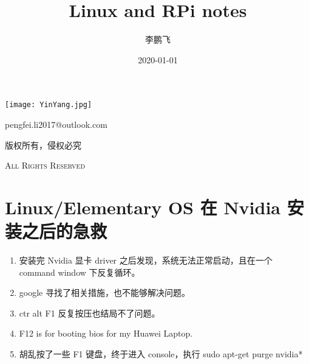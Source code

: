 \documentclass[UTF8,fancyhdr,a4paper]{ctexart}
\title{Linux and RPi notes}
\author{李鹏飞}
\date{2020-01-01}
\begin{document}
\begin{titlepage}
      \maketitle
      \centering
      \vspace{10cm}
      \texttt{[image: YinYang.jpg]}\par
      \vspace{1cm}
      {\huge pengfei.li2017@outlook.com}\par
      \vspace{0.5cm}
      {\small 版权所有，侵权必究}\par
      \vspace{0.5cm}
      {\scshape \small All Rights Reserved}
\end{titlepage}

\tableofcontents
{}%
\clearpage
\listoffigures
{}
\clearpage
\listoftables
{}
\clearpage




\newpage
{}
\section{Linux/Elementary OS 在 Nvidia 安装之后的急救}
\begin{enumerate}
      \item 安装完 Nvidia 显卡 driver 之后发现，系统无法正常启动，且在一个 command window 下反复循环。
      \item google 寻找了相关措施，也不能够解决问题。
      \item ctr alt F1 反复按压也结局不了问题。
      \item F12 is for booting bios for my Huawei Laptop.
      \item 胡乱按了一些 F1 键盘，终于进入 console，执行 sudo apt-get purge nvidia*
\end{enumerate}
\end{document}
